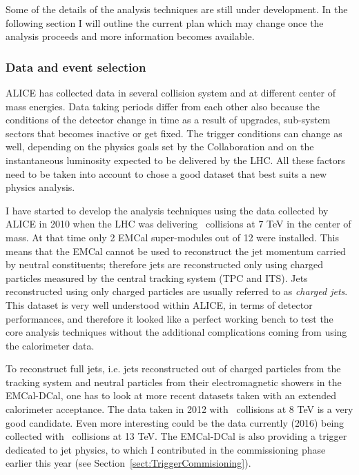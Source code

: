 \documentclass[12pt, a4paper, twoside, titlepage]{article}
\begin{document}
Some of the details of the analysis techniques are still under development. In the following section
I will outline the current plan which may change once the analysis proceeds and more information becomes available.

\subsubsection{Data and event selection}
ALICE has collected data in several collision system and at different center of mass energies.
Data taking periods differ from each other also because the conditions of the detector change in time as a result of upgrades,
sub-system sectors that becomes inactive or get fixed. The trigger conditions can change as well, depending on the
physics goals set by the Collaboration and on the instantaneous luminosity expected to be delivered by the LHC.
All these factors need to be taken into account to chose a good dataset that best suits a new physics analysis.

I have started to develop the analysis techniques using the data collected by ALICE in 2010 when the LHC was
delivering \pp\ collisions at 7 TeV in the center of mass. At that time only 2 EMCal super-modules out of 12 were installed.
This means that the EMCal cannot be used to reconstruct the jet momentum carried by neutral constituents; therefore jets are
reconstructed only using charged particles measured by the central tracking system (TPC and ITS).
Jets reconstructed using only charged particles are usually referred to as \emph{charged jets}. This dataset is very
well understood within ALICE, in terms of detector performances, and therefore it looked like a perfect working bench
to test the core analysis techniques without the additional complications coming from using the calorimeter data.

To reconstruct full jets, i.e. jets reconstructed out of charged particles from the tracking system and neutral particles from their
electromagnetic showers in the EMCal-DCal, one has to look at more recent datasets taken with an extended calorimeter acceptance.
The data taken in 2012 with \pp\ collisions at 8 TeV is a very good candidate. Even more interesting could be the data currently (2016)
being collected with \pp\ collisions at 13 TeV. The EMCal-DCal is also providing a trigger dedicated to jet physics, 
to which I contributed in the commissioning phase earlier this year (see Section~\ref{sect:TriggerCommisioning}).
\end{document}
